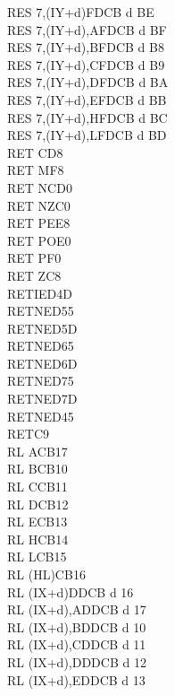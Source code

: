 \begin{multicols}{3}
{\begin{tabbing}
        RES 7,(IY+d)\>FDCB d BE\\
        RES 7,(IY+d),A\UNDOC\>FDCB d BF\\
        RES 7,(IY+d),B\UNDOC\>FDCB d B8\\
        RES 7,(IY+d),C\UNDOC\>FDCB d B9\\
        RES 7,(IY+d),D\UNDOC\>FDCB d BA\\
        RES 7,(IY+d),E\UNDOC\>FDCB d BB\\
        RES 7,(IY+d),H\UNDOC\>FDCB d BC\\
        RES 7,(IY+d),L\UNDOC\>FDCB d BD\\
        RET C\>D8\\
        RET M\>F8\\
        RET NC\>D0\\
        RET NZ\>C0\\
        RET PE\>E8\\
        RET PO\>E0\\
        RET P\>F0\\
        RET Z\>C8\\
        RETI\>ED4D\\
        RETN\UNDOC\>ED55\\
        RETN\UNDOC\>ED5D\\
        RETN\UNDOC\>ED65\\
        RETN\UNDOC\>ED6D\\
        RETN\UNDOC\>ED75\\
        RETN\UNDOC\>ED7D\\
        RETN\>ED45\\
        RET\>C9\\
        RL A\>CB17\\
        RL B\>CB10\\
        RL C\>CB11\\
        RL D\>CB12\\
        RL E\>CB13\\
        RL H\>CB14\\
        RL L\>CB15\\
        RL (HL)\>CB16\\
        RL (IX+d)\>DDCB d 16\\
        RL (IX+d),A\UNDOC\>DDCB d 17\\
        RL (IX+d),B\UNDOC\>DDCB d 10\\
        RL (IX+d),C\UNDOC\>DDCB d 11\\
        RL (IX+d),D\UNDOC\>DDCB d 12\\
        RL (IX+d),E\UNDOC\>DDCB d 13\\

\end{tabbing}}
\end{multicols}
